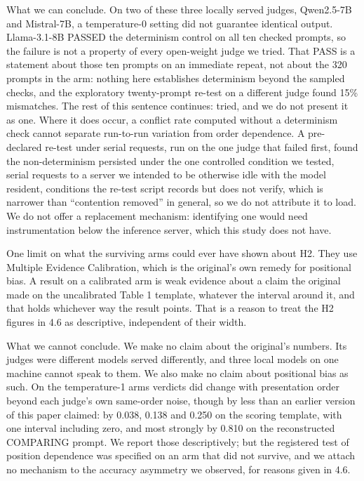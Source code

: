 What we can conclude. On two of these three locally served judges, Qwen2.5-7B and Mistral-7B, a
temperature-0 setting did not guarantee identical output. Llama-3.1-8B PASSED the determinism
control on all ten checked prompts, so the failure is not a property of every open-weight judge we
tried. That PASS is a statement about those ten prompts on an immediate repeat, not about the 320
prompts in the arm: nothing here establishes determinism beyond the sampled checks, and the
exploratory twenty-prompt re-test on a different judge found 15\% mismatches. The rest of this
sentence continues:
tried, and we do not present it as one. Where it does occur, a conflict rate computed without a
determinism check cannot separate run-to-run variation from order dependence. A pre-declared re-test under serial requests, run on the
one judge that failed first, found the non-determinism persisted under the one controlled condition we tested, serial requests to a server we intended to be otherwise idle with the model resident, conditions the re-test script records but does not verify, which is narrower than ``contention removed'' in general, so we do
not attribute it to load. We do not offer a replacement mechanism: identifying one would need
instrumentation below the inference server, which this study does not have.

One limit on what the surviving arms could ever have shown about H2. They use Multiple Evidence
Calibration, which is the original's own remedy for positional bias. A result on a calibrated arm is weak evidence about a claim the original made on the uncalibrated
Table 1 template, whatever the interval around it, and that holds whichever way the result points. That is a reason to treat the H2 figures in 4.6 as descriptive, independent of
their width.

What we cannot conclude. We make no claim about the original's numbers. Its judges were different
models served differently, and three local models on one machine cannot speak to them. We also make
no claim about positional bias as such. On the temperature-1 arms verdicts did change with presentation order beyond each judge's own
same-order noise, though by less than an earlier version of this paper claimed: by 0.038, 0.138
and 0.250 on the scoring template, with one interval including zero, and most strongly by 0.810
on the reconstructed COMPARING prompt. We report those descriptively; but the registered test of position dependence was
specified on an arm that did not survive, and we attach no mechanism to the accuracy asymmetry we
observed, for reasons given in 4.6.

